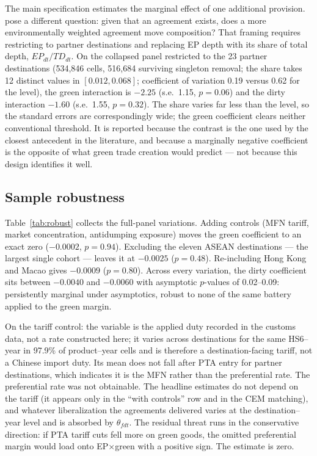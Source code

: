 \documentclass[12pt]{article}
\begin{document}
The main specification estimates the marginal effect of one additional provision.
\citet{abman2024} pose a different question: given that an agreement exists, does a more
environmentally weighted agreement move composition? That framing requires restricting to
partner destinations and replacing EP depth with its share of total depth,
$EP_{dt}/TD_{dt}$. On the collapsed panel restricted to the 23 partner destinations
(534{,}846 cells, 516{,}684 surviving singleton removal; the share takes 12 distinct values
in $[0.012, 0.068]$; coefficient of variation 0.19 versus 0.62 for the level), the green
interaction is $-2.25$ (s.e.\ 1.15, $p = 0.06$) and the dirty interaction $-1.60$
(s.e.\ 1.55, $p = 0.32$). The share varies far less than the level, so the standard
errors are correspondingly wide; the green coefficient clears neither conventional
threshold. It is reported because the contrast is the one used by the closest antecedent
in the literature, and because a marginally negative coefficient is the opposite of what
green trade creation would predict --- not because this design identifies it well.

\subsection{Sample robustness}

Table~\ref{tab:robust} collects the full-panel variations. Adding controls (MFN tariff,
market concentration, antidumping exposure) moves the green coefficient to an exact zero
($-0.0002$, $p = 0.94$). Excluding the eleven ASEAN destinations --- the largest single
cohort --- leaves it at $-0.0025$ ($p = 0.48$). Re-including Hong Kong and Macao gives
$-0.0009$ ($p = 0.80$). Across every variation, the dirty coefficient sits between
$-0.0040$ and $-0.0060$ with asymptotic $p$-values of 0.02--0.09: persistently marginal
under asymptotics, robust to none of the same battery applied to the green margin.

\begin{table}[htbp]
\centering
\caption{Sample robustness (full firm-level panel, WB index)}
\label{tab:robust}

\end{table}

On the tariff control: the variable is the applied duty recorded in the customs data,
not a rate constructed here; it varies across destinations for the same HS6--year in
97.9\% of product--year cells and is therefore a destination-facing tariff, not a
Chinese import duty. Its mean does not fall after PTA entry for partner destinations,
which indicates it is the MFN rather than the preferential rate. The preferential rate
was not obtainable. The headline estimates do not depend on the tariff (it appears only
in the ``with controls'' row and in the CEM matching), and whatever liberalization the
agreements delivered varies at the destination--year level and is absorbed by
$\theta_{fdt}$. The residual threat runs in the conservative direction: if PTA tariff
cuts fell more on green goods, the omitted preferential margin would load onto
EP$\times$green with a positive sign. The estimate is zero.
\end{document}
